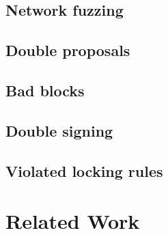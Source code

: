 \subsection{Network fuzzing}

\subsection{Double proposals}

\subsection{Bad blocks}

\subsection{Double signing}

\subsection{Violated locking rules}



\section{Related Work}
